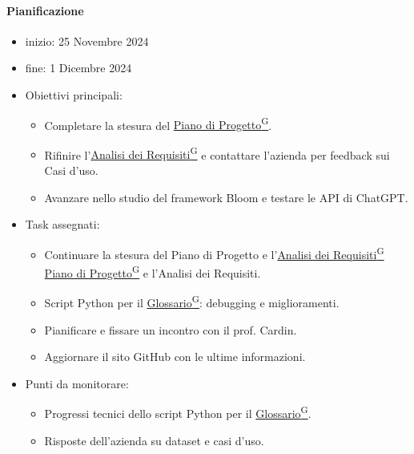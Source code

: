 \documentclass{article}
\begin{document}
                \paragraph{Pianificazione}
                \begin{itemize}
                    \item inizio: 25 Novembre 2024
                    \item fine: 1 Dicembre 2024
                \end{itemize}
                \begin{itemize}
                    \item Obiettivi principali:
                    \begin{itemize}
                        \item Completare la stesura del \href{https://code7crusaders.github.io/docs/PB/documentazione_interna/glossario.html#piano-di-progetto}{Piano di Progetto\textsuperscript{G}}.
                        \item Rifinire l'\href{https://code7crusaders.github.io/docs/PB/documentazione_interna/glossario.html#analisi-dei-requisiti}{Analisi dei Requisiti\textsuperscript{G}} e contattare l'azienda per feedback sui Casi d'uso.
                        \item Avanzare nello studio del framework Bloom e testare le API di ChatGPT.
                        \end{itemize}
                    \item Task assegnati:
                    \begin{itemize}
                        \item Continuare la stesura del Piano di Progetto e l'\href{https://code7crusaders.github.io/docs/PB/documentazione_interna/glossario.html#analisi-dei-requisiti}{Analisi dei Requisiti\textsuperscript{G}} \href{https://code7crusaders.github.io/docs/PB/documentazione_interna/glossario.html#piano-di-progetto}{Piano di Progetto\textsuperscript{G}} e l'Analisi dei Requisiti.
                        \item Script Python per il \href{https://code7crusaders.github.io/docs/PB/documentazione_interna/glossario.html#glossario}{Glossario\textsuperscript{G}}: debugging e miglioramenti.
                        \item Pianificare e fissare un incontro con il prof. Cardin.
                        \item Aggiornare il sito GitHub con le ultime informazioni.
                        \end{itemize}
                    \item Punti da monitorare:
                    \begin{itemize}
                        \item Progressi tecnici dello script Python per il \href{https://code7crusaders.github.io/docs/PB/documentazione_interna/glossario.html#glossario}{Glossario\textsuperscript{G}}.
                        \item Risposte dell'azienda su dataset e casi d'uso.
                        \end{itemize}
                \end{itemize}
\end{document}
